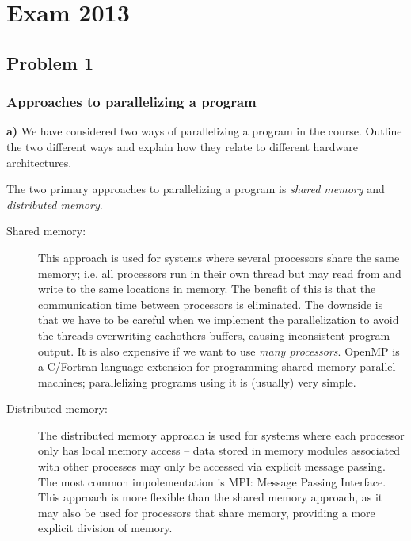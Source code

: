
\section{Exam 2013} %
\label{sec:exam_2013}
\subsection{Problem 1} %
\label{sub:problem_1}

\subsubsection{Approaches to parallelizing a program} %
\label{ssub:approaches_to_parallelizing_a_program}

\begin{question}
  \textbf{a)} We have considered two ways of parallelizing a program in the course. Outline the two different ways and explain how they relate to different hardware architectures.
\end{question}

The two primary approaches to parallelizing a program is \emph{shared memory} and \emph{distributed memory}.

\begin{description}
  \item[Shared memory:] This approach is used for systems where several processors share the same memory; i.e. all processors run in their own thread but may read from and write to the same locations in memory. The benefit of this is that the communication time between processors is eliminated. The downside is that we have to be careful when we implement the parallelization to avoid the threads overwriting eachothers buffers, causing inconsistent program output. It is also expensive if we want to use \emph{many processors}. OpenMP is a C/Fortran language extension for programming shared memory parallel machines; parallelizing programs using it is (usually) very simple.
  \item[Distributed memory:] The distributed memory approach is used for systems where each processor only has local memory access -- data stored in memory modules associated with other processes may only be accessed via explicit message passing. The most common impolementation is MPI: Message Passing Interface. This approach is more flexible than the shared memory approach, as it may also be used for processors that share memory, providing a more explicit division of memory.
\end{description}

